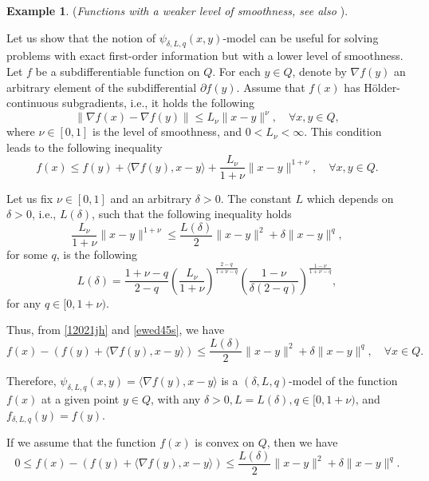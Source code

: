 \documentclass[11pt]{amsart}
\theoremstyle{definition}
\newtheorem{example}[theorem]{Example}
\numberwithin{equation}{section}
\begin{document}
\begin{example}\label{ex4_inexact} (\textit{Functions with a weaker level of smoothness, see also \cite{Devolder2013smooth}}).

Let us show that the notion of
$\psi_{\delta, L, q} (x,y)$-model can be useful for solving problems with exact first-order information but with a lower level of smoothness. Let $f$ be a subdifferentiable
function on $Q$. For each $y \in Q$, denote by $\nabla f(y)$ an arbitrary element of the subdifferential $\partial f (y)$. Assume that $f(x)$ has H\"{o}lder-continuous subgradients, i.e., it holds the following  
\begin{equation}\label{holder_cond}
    \|\nabla f(x) - \nabla f(y)\| \leq L_{\nu} \|x - y\|^{\nu}, \quad \forall x, y \in Q,
\end{equation}
where $\nu \in [0, 1]$ is the level of smoothness, and $0 < L_{\nu} <  \infty$. This condition leads to the following inequality
\begin{equation}\label{12021jh}
    f(x) \leq f(y) + \langle \nabla f(y), x - y \rangle + \frac{L_{\nu}}{1+ \nu} \|x - y\|^{1+\nu}, \quad \forall x, y \in Q. 
\end{equation}

Let us fix $\nu \in [0,1]$ and an arbitrary $\delta > 0$. The constant $L$ which depends on $\delta >0$, i.e., $L(\delta)$, such that the following inequality holds
\begin{equation}\label{ewed45s}
    \frac{L_\nu}{1+\nu}\|x-y\|^{1+\nu} \leq \frac{L(\delta)}{2}\|x-y\|^2+\delta\|x-y\|^q, 
\end{equation}
for some $q$, is the following \cite{Nabou2024qoracle}
\[
    L(\delta)=\frac{1+\nu-q}{2-q}\left(\frac{L_\nu}{1+\nu}\right)^{\frac{2-q}{1+\nu-q}}\left(\frac{1-\nu}{\delta(2-q)}\right)^{\frac{1-\nu}{1+\nu-q}}, 
\]
for any $q \in [0,1+ \nu).$

Thus, from \eqref{12021jh} and \eqref{ewed45s}, we have 
\begin{equation*}
    f(x) - \left( f(y) + \langle \nabla f(y), x - y \rangle \right) \leq  \frac{L(\delta)}{2}\|x-y\|^2+\delta\|x-y\|^q, \quad \forall x \in Q. 
\end{equation*}

Therefore, $\psi_{\delta, L, q} (x,y) =\langle \nabla f(y), x - y \rangle $ is a $(\delta, L, q)$-model of the function $f(x)$ at a given point $y \in Q$, with any $\delta >0, L = L(\delta), q \in [0, 1 + \nu)$, and $f_{\delta, L, q} (y) = f(y)$.

If we assume that the function $f(x)$ is convex on $Q$, then we have 
\begin{equation*}
    0 \leq f(x) - \left( f(y) + \langle \nabla f(y), x - y \rangle \right) \leq  \frac{L(\delta)}{2}\|x-y\|^2+\delta\|x-y\|^q. 
\end{equation*}


\end{example}
\end{document}
